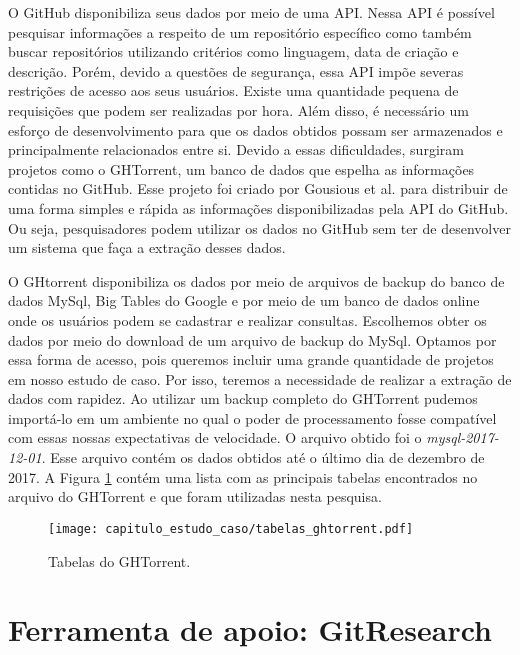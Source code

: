 O GitHub disponibiliza seus dados por meio de uma API. Nessa API é possível pesquisar informações a respeito de um repositório específico como também buscar repositórios utilizando critérios como linguagem, data de criação e descrição. Porém, devido a questões de segurança, essa API impõe severas restrições de acesso aos seus usuários.  Existe uma quantidade pequena de requisições que podem ser realizadas por hora. Além disso, é necessário um esforço de desenvolvimento para que os dados obtidos possam ser armazenados e principalmente relacionados entre si. Devido a essas dificuldades, surgiram projetos como o GHTorrent, um banco de dados que espelha as informações contidas no GitHub. Esse projeto foi criado por Gousious et al. \cite{gousios2012ghtorrent} para distribuir de uma forma simples e rápida as informações disponibilizadas pela API do GitHub. Ou seja, pesquisadores podem utilizar os dados no GitHub sem ter de desenvolver um sistema que faça a extração desses dados. 

O GHtorrent disponibiliza os dados por meio de arquivos de backup do banco de dados MySql, Big Tables do Google e por meio de um banco de dados online onde os usuários podem se cadastrar e realizar consultas. Escolhemos obter os dados por meio do download de um arquivo de backup do MySql. Optamos por essa forma de acesso, pois queremos incluir uma grande quantidade de projetos em nosso estudo de caso. Por isso, teremos a necessidade de realizar a extração de dados com rapidez. Ao utilizar um backup completo do GHTorrent pudemos importá-lo em um ambiente no qual o poder de processamento fosse compatível com essas nossas expectativas de velocidade.  O arquivo obtido foi o \textit{mysql-2017-12-01}. Esse arquivo contém os dados obtidos até o último dia de dezembro de 2017. A Figura \ref{fig:tabelas_ghtorrent} contém uma lista com as  principais tabelas encontrados no arquivo do GHTorrent e que foram utilizadas nesta pesquisa.


 \begin{figure}[H]
  \centering
  \texttt{[image: capitulo\_estudo\_caso/tabelas\_ghtorrent.pdf]} 
  \caption{Tabelas do GHTorrent.}
  \label{fig:tabelas_ghtorrent} 
\end{figure}





\section{Ferramenta de apoio: GitResearch}
\label{cap_estudo_caso_ferramenta}

